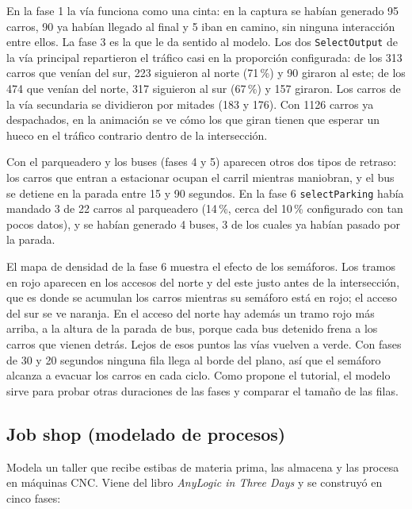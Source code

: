 \documentclass[11pt,letterpaper]{article}
\begin{document}
En la fase 1 la vía funciona como una cinta: en la captura se habían generado 95 carros, 90 ya habían llegado
al final y 5 iban en camino, sin ninguna interacción entre ellos. La fase 3 es la que le da sentido al modelo. Los
dos \texttt{SelectOutput} de la vía principal repartieron el tráfico casi en la proporción configurada: de los 313
carros que venían del sur, 223 siguieron al norte (71\,\%) y 90 giraron al este; de los 474 que venían del norte,
317 siguieron al sur (67\,\%) y 157 giraron. Los carros de la vía secundaria se dividieron por mitades (183 y
176). Con 1126 carros ya despachados, en la animación se ve cómo los que giran tienen que esperar un hueco en el
tráfico contrario dentro de la intersección.

Con el parqueadero y los buses (fases 4 y 5) aparecen otros dos tipos de retraso: los carros que entran a
estacionar ocupan el carril mientras maniobran, y el bus se detiene en la parada entre 15 y 90 segundos. En la
fase 6 \texttt{selectParking} había mandado 3 de 22 carros al parqueadero (14\,\%, cerca del 10\,\% configurado con
tan pocos datos), y se habían generado 4 buses, 3 de los cuales ya habían pasado por la parada.

El mapa de densidad de la fase 6 muestra el efecto de los semáforos. Los tramos en rojo aparecen en los accesos
del norte y del este justo antes de la intersección, que es donde se acumulan los carros mientras su semáforo
está en rojo; el acceso del sur se ve naranja. En el acceso del norte hay además un tramo rojo más arriba, a la
altura de la parada de bus, porque cada bus detenido frena a los carros que vienen detrás. Lejos de esos puntos
las vías vuelven a verde. Con fases de 30 y 20 segundos ninguna fila llega al borde del plano, así
que el semáforo alcanza a evacuar los carros en cada ciclo. Como propone el tutorial, el modelo sirve para probar
otras duraciones de las fases y comparar el tamaño de las filas.

\subsection{Job shop (modelado de procesos)}

Modela un taller que recibe estibas de materia prima, las almacena y las procesa en máquinas CNC. Viene del libro
\emph{AnyLogic in Three Days} y se construyó en cinco fases:
\end{document}
